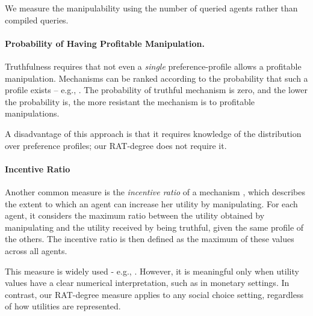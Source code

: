 We measure the manipulability using the number of queried agents rather than compiled queries.
\fi




\paragraph{Probability of Having Profitable Manipulation.} 
Truthfulness requires that not even a \emph{single} preference-profile allows a profitable manipulation.
Mechanisms can be ranked according to the probability that such a profile exists -- e.g., \citep{barrot2017manipulation,lackner2018approval,lackner2023free}.
The probability of truthful mechanism is zero, and the lower the probability is, the more resistant the mechanism is to profitable manipulations.

A disadvantage of this approach is that it requires knowledge of the distribution over preference profiles; our RAT-degree does not require it.




\iffalse
\paragraph{Bayesian Incentive Compatibility}

\fi



\paragraph{Incentive Ratio} Another common measure is the \emph{incentive ratio} of a mechanism \citet{chen2011profitable}, which describes the extent to which an agent can increase her utility by manipulating. For each agent, it considers the maximum ratio between the utility obtained by manipulating and the utility received by being truthful, given the same profile of the others. The incentive ratio is then defined as the maximum of these values across all agents.

This measure is widely used - e.g., \cite{chen2022incentive,li2024bounding,cheng2022tight,cheng2019improved}.
However, it is meaningful only when utility values have a clear numerical interpretation, such as in monetary settings.
In contrast, our RAT-degree measure applies to any social choice setting, regardless of how utilities are represented.

